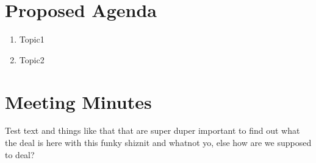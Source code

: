 \documentclass[11pt, a4paper]{article}
\begin{document}
\setafport
{} %

\meetingInfo %

\section{Proposed Agenda} \label{sec: Proposed Agenda}

	\begin{enumerate}
		\item Topic1
		\item Topic2
	\end{enumerate}
    		
\section{Meeting Minutes} \label{sec: Meeting Minutes}

	
	Test text and things like that that are super duper important to find out 
	what the deal is here with this funky shiznit and whatnot yo, else how
	are we supposed to deal?
\end{document}
